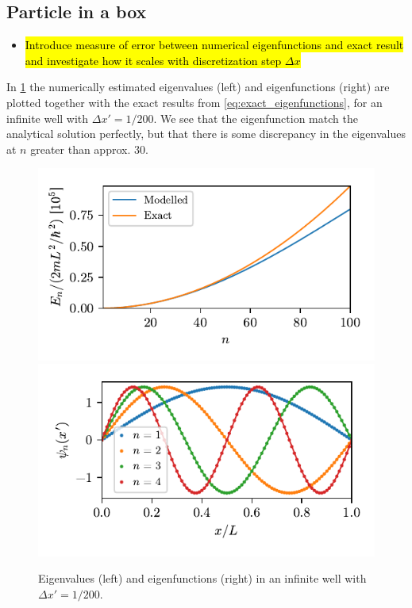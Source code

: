 \subsection*{Particle in a box}
\begin{itemize}
    \item \hl{Introduce measure of error between numerical eigenfunctions and exact result and investigate how it scales with discretization step $\Delta x$}
\end{itemize}

In \cref{fig:box_solutions} the numerically estimated eigenvalues (left) and eigenfunctions (right) are plotted together with the exact results from \cref{eq:exact_eigenfunctions}, for an infinite well with $\Delta x' = 1/200$. We see that the eigenfunction match the analytical solution perfectly, but that there is some discrepancy in the eigenvalues at $n$ greater than approx. 30.

\begin{figure}[ht!]%
\centering%
\includegraphics{figs/box_eigenvalues.pdf}%
\includegraphics{figs/box_eigenvectors.pdf}%
\caption{Eigenvalues (left) and eigenfunctions (right) in an infinite well with $\Delta x' = 1/200$. \label{fig:box_solutions}}%
\end{figure}

